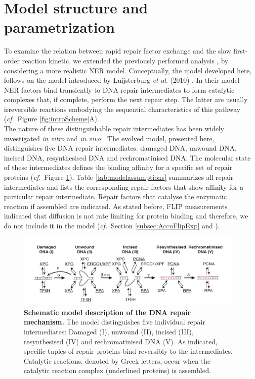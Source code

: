 \section{Model structure and parametrization}
To examine the relation between rapid repair factor exchange and the slow first-order reaction kinetic, we extended the previously performed analysis \cite{Luijsterburg2010,Terstiege2010}, by considering a more realistic NER model. Conceptually, the model developed here, follows on the model introduced by Luijsterburg \textit{et al.} (2010) \cite{Luijsterburg2010}. In their model NER factors bind transiently to DNA repair intermediates to form catalytic complexes that, if complete, perform the next repair step. The latter are usually irreversible reactions embodying the sequential characteristics of this pathway (\textit{cf.}\ Figure \ref{fig:introScheme}A).\\
The nature of these distinguishable repair intermediates has been widely investigated \textit{in vitro} and \textit{in vivo} \cite{Evans1997a,Mu1996,Polo2006,Tapias2004}.
The evolved model, presented here, distinguishes five DNA repair intermediates: damaged DNA, unwound DNA, incised DNA, resynthesised DNA and rechromatinised DNA. The molecular state of these intermediates defines the binding affinity for a specific set of repair proteins (\textit{cf.}\ Figure \ref{fig:ModelStructure}). Table \ref{tab:modelassumptions} summarizes all repair intermediates and lists the corresponding repair factors that show affinity for a particular repair intermediate. Repair factors that catalyse the enzymatic reaction if assembled are indicated. As stated before, FLIP measurements indicated that diffusion is not rate limiting for protein binding and therefore, we do not include it in the model (\textit{cf.}\ Section \ref{subsec:AccuFlipExp} and \cite{Rademakers2003,Zotter2006}).              


\begin{figure}[b!]
\begin{center}
\includegraphics[width=1\textwidth]{Abbildungen/figure2_5.pdf}
\caption{\textbf{Schematic model description of the DNA repair mechanism.} The model distinguishes five individual repair intermediates: Damaged (I), unwound (II), incised (III), resynthesised (IV) and rechromatinised DNA (V). As indicated, specific tuples of repair proteins bind reversibly to the intermediates. Catalytic reactions, denoted by Greek letters, occur when the catalytic reaction complex (underlined proteins) is assembled.}
\label{fig:ModelStructure}
\end{center}
\end{figure}


